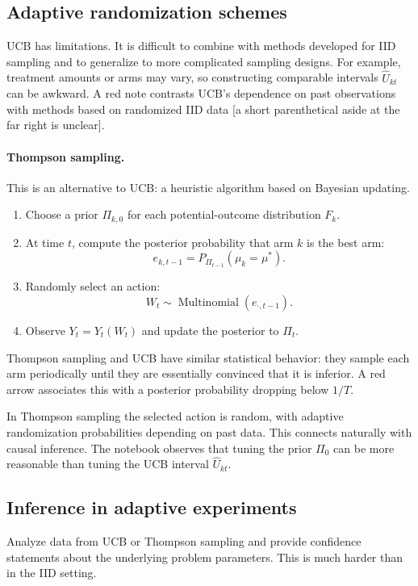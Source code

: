 \subsection{Adaptive randomization schemes}
UCB has limitations. It is difficult to combine with methods developed for IID sampling and to generalize to more complicated sampling designs. For example, treatment amounts or arms may vary, so constructing comparable intervals $\widehat U_{kt}$ can be awkward. A red note contrasts UCB's dependence on past observations with methods based on randomized IID data [a short parenthetical aside at the far right is unclear].

\paragraph{Thompson sampling.}
This is an alternative to UCB: a heuristic algorithm based on Bayesian updating.
\begin{enumerate}
 \item Choose a prior $\Pi_{k,0}$ for each potential-outcome distribution $F_k$.
 \item At time $t$, compute the posterior probability that arm $k$ is the best arm:
 \[e_{k,t-1}=P_{\Pi_{t-1}}(\mu_k=\mu^*).\]
 \item Randomly select an action:
 \[W_t\sim\operatorname{Multinomial}(e_{\cdot,t-1}).\]
 \item Observe $Y_t=Y_t(W_t)$ and update the posterior to $\Pi_t$.
\end{enumerate}
Thompson sampling and UCB have similar statistical behavior: they sample each arm periodically until they are essentially convinced that it is inferior. A red arrow associates this with a posterior probability dropping below $1/T$.

In Thompson sampling the selected action is random, with adaptive randomization probabilities depending on past data. This connects naturally with causal inference. The notebook observes that tuning the prior $\Pi_0$ can be more reasonable than tuning the UCB interval $\widehat U_{kt}$.

\subsection{Inference in adaptive experiments}
Analyze data from UCB or Thompson sampling and provide confidence statements about the underlying problem parameters. This is much harder than in the IID setting.

